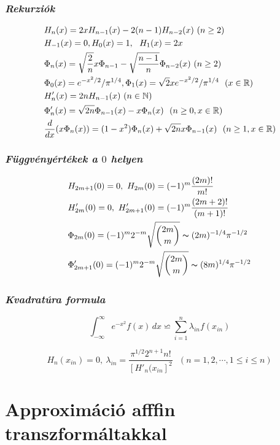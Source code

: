 \documentclass[oneside,titlepage,12pt,a4paper]{report}
\begin{document}
\subsubsection{\it  Rekurziók}
\begin{equation}
\begin{split}
&H_n(x)=2xH_{n-1}(x)-2(n-1)H_{n-2}(x)\ (n\ge 2)\\
&H_{-1}(x)=0,  H_0(x)=1,\ \ H_1(x)=2x\\
&\Phi_n(x)=\sqrt{\frac 2 n}x\Phi_{n-1}-\sqrt{\frac {n-1} n}\Phi_{n-2}(x)\ (n\ge 2)\\ &\Phi_0(x)=e^{-x^2/2}/\pi^{1/4}, \Phi_1(x)= \sqrt 2 x e^{-x^2/2}/\pi^{1/4}\ \ (x\in\Bbb R)\\
&H'_n(x)=2nH_{n-1}(x)\ (n\in\Bbb N)\\
&\Phi'_n(x)=\sqrt{2n}\Phi_{n-1}(x)-x\Phi_n(x)\ \ (n\ge 0, x\in\Bbb R)\\
&\frac d{dx}(x\Phi_n(x))=(1-x^2)\Phi_n(x)+\sqrt{2n}x\Phi_{n-1}(x)\ \ (n\ge 1, x\in\Bbb R)
\label{eq:identities}
\end{split}
\end{equation}

\subsubsection{\it  Függvényértékek a $0$ helyen}
\begin{equation}
\begin{split}
&H_{2m+1}(0)=0,\ H_{2m}(0)=(-1)^m\frac{(2m)!}{m!}\\
&H'_{2m}(0)=0,\ H'_{2m+1}(0)=(-1)^m\frac{(2m+2)!}{(m+1)!}\\
&\Phi_{2m}(0)=(-1)^m2^{-m}\sqrt{\binom {2m}m}\thicksim (2 m)^{-1/4}\pi^{-1/2}\\
&\Phi'_{2m+1}(0)=(-1)^m2^{-m}\sqrt{\binom {2m}m}\thicksim (8m)^{1/4}\pi^{-1/2}
\end{split}
\end{equation}

\subsubsection{\it Kvadratúra formula}
$$
\int_{-\infty}^\infty e^{-x^2}f(x)\, dx\backsimeq \sum_{i=1}^n \lambda_{in}f(x_{in})
$$

$$
H_n(x_{in})=0,\ \lambda_{in}=\frac{\pi^{1/2}2^{n+1}n!}{[H'_n(x_{in}]^2}\ \ \  (n=1,2,\cdots, 1\le i\le n)
$$

\section{Approximáció afffin transzformáltakkal}
\label{app:aprx}
\end{document}
